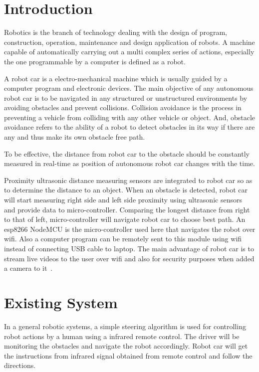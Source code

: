 \maketitle

\section{Introduction}
Robotics is the branch of technology dealing with the design of program, 
construction, operation, maintenance and design application of robots. A 
machine capable of automatically carrying out a multi complex series of 
actions, especially the one programmable by a computer is defined as a 
robot. 

A robot car is a electro-mechanical machine which is usually guided by a 
computer program and electronic devices. The main objective of any 
autonomous robot car is to be navigated in any structured or unstructured 
environments by avoiding obstacles and prevent collisions. 
Collision avoidance is the process in preventing a vehicle from colliding 
with any other vehicle or object. And, obstacle avoidance refers to the 
ability of a robot to detect obstacles in its way if there are any and thus 
make its own obstacle free path.

To be effective, the distance from robot car to the obstacle should be 
constantly measured in real-time as position of autonomous robot car changes 
with the time.

Proximity ultrasonic distance measuring sensors are integrated to robot car 
so as to determine the distance to an object. When an obstacle is detected, 
robot car will start measuring right side and left side proximity using 
ultrasonic sensors and provide data to micro-controller. Comparing the 
longest distance from right to that of left, micro-controller will navigate 
robot car to choose best path. An esp8266 NodeMCU is the micro-controller 
used here that navigates the robot over wifi. Also a computer program can be 
remotely sent to this module using wifi instead of connecting USB cable to 
laptop. The main advantage of robot car is to stream live videos to the 
user over wifi and also for security purposes when added a camera to 
it~\cite{gregor2017}.

\section{Existing System}
In a general robotic systems, a simple steering algorithm is used for 
controlling robot actions by a human using a infrared remote control. The 
driver will be monitoring the obstacles and navigate the robot accordingly. 
Robot car will get the instructions from infrared signal obtained from 
remote control and follow the directions.


